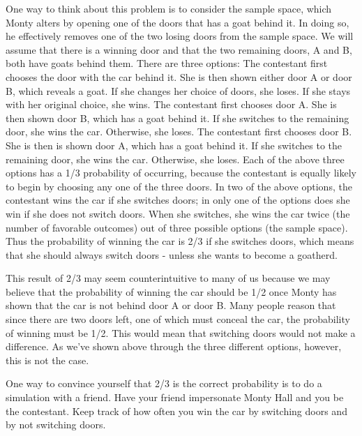 \documentclass[12pt,a4paper]{article}
\begin{document}
\begin{titlepage}
One way to think about this problem is to consider the sample space, which Monty alters by opening one of the doors that has a goat behind it. In doing so, he effectively removes one of the two losing doors from the sample space.
We will assume that there is a winning door and that the two remaining doors, A and B, both have goats behind them. There are three options:
\newpage
The contestant first chooses the door with the car behind it. She is then shown either door A or door B, which reveals a goat. If she changes her choice of doors, she loses. If she stays with her original choice, she wins.
The contestant first chooses door A. She is then shown door B, which has a goat behind it. If she switches to the remaining door, she wins the car. Otherwise, she loses.
The contestant first chooses door B. She is then is shown door A, which has a goat behind it. If she switches to the remaining door, she wins the car. Otherwise, she loses.
Each of the above three options has a 1/3 probability of occurring, because the contestant is equally likely to begin by choosing any one of the three doors. In two of the above options, the contestant wins the car if she switches doors; in only one of the options does she win if she does not switch doors. When she switches, she wins the car twice (the number of favorable outcomes) out of three possible options (the sample space). Thus the probability of winning the car is 2/3 if she switches doors, which means that she should always switch doors - unless she wants to become a goatherd.

This result of 2/3 may seem counterintuitive to many of us because we may believe that the probability of winning the car should be 1/2 once Monty has shown that the car is not behind door A or door B. Many people reason that since there are two doors left, one of which must conceal the car, the probability of winning must be 1/2. This would mean that switching doors would not make a difference. As we've shown above through the three different options, however, this is not the case.

One way to convince yourself that 2/3 is the correct probability is to do a simulation with a friend. Have your friend impersonate Monty Hall and you be the contestant. Keep track of how often you win the car by switching doors and by not switching doors.


\end{titlepage}
\end{document}
